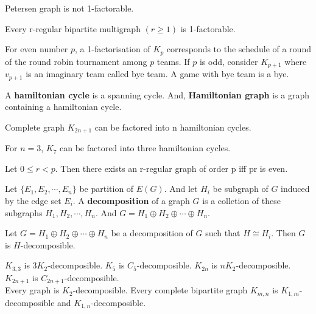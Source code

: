 \begin{theorem}
	Petersen graph is not 1-factorable.
\end{theorem}

\begin{theorem}
	Every r-regular bipartite multigraph $(r \ge 1)$ is 1-factorable.
\end{theorem}

\begin{remark}
	For even number $p$, a 1-factorisation of $K_p$ corresponds to the schedule of a round of the round robin tournament among $p$ teams. If $p$ is odd, consider $K_{p+1}$ where $v_{p+1}$ is an imaginary team called bye team. A game with bye team is a bye.
\end{remark}

\begin{definition}
	A \textbf{hamiltonian cycle} is a spanning cycle. And, \textbf{Hamiltonian graph} is a graph containing a hamiltonian cycle.
\end{definition}

\begin{theorem}
	Complete graph $K_{2n+1}$ can be factored into n hamiltonian cycles.
\end{theorem}

\begin{remark}
	For $n=3$, $K_7$ can be factored into three hamiltonian cycles.
\end{remark}

\begin{theorem}
	Let $0 \le r < p$. Then there exists an r-regular graph of order p iff pr is even.
\end{theorem}

\begin{definition}
	Let $\{E_1, E_2, \cdots, E_n \}$ be partition of $E(G)$. And let $H_i$ be subgraph of $G$ induced by the edge set $E_i$. A \textbf{decomposition} of a graph $G$ is a colletion of these subgraphs $H_1, H_2, \cdots, H_n$. And $G = H_1 \oplus H_2 \oplus \cdots \oplus H_n$.
\end{definition}

\begin{definition}
	Let $G = H_1 \oplus H_2 \oplus \cdots \oplus H_n$ be a decomposition of $G$ such that $H \cong H_i$. Then $G$ is $H$-decomposible.
\end{definition}

\begin{remark}
	$K_{3,3}$ is $3K_2$-decomposible. $K_5$ is $C_5$-decomposible. $K_{2n}$ is $nK_2$-decomposible. $K_{2n+1}$ is $C_{2n+1}$-decomposible.\\
	Every graph is $K_2$-decomposible. Every complete bipartite graph $K_{m,n}$ is $K_{1,m}$-decomposible and $K_{1,n}$-decomposible.
\end{remark}

